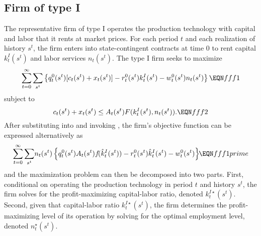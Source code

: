 \subsection{Firm of type I}
The representative firm of type I operates the production technology
with capital and labor that it rents at market prices. For each period
$t$ and each realization of history $s^t$, the firm enters into
state-contingent contracts at time $0$ to rent capital $k^{I}_t(s^t)$
and labor services $n_t(s^t)$. The type I firm
seeks to maximize
$$ \sumst \left\{\qst [\cst +\xst]   -\rst k^I_t(s^t)
   -\wst \nst \right\} \EQN fff1 $$
subject to
$$ \cst +\xst \leq \Ast F(k^I_t(s^t), \nst). \EQN fff2 $$
After substituting  into  and invoking
, the firm's objective function can be
expressed alternatively as
$$ \sumst \nst\left\{\qst \Ast f\!(\hat k^I_t(s^t))
    -\rst \hat k^I_t(s^t)  -\wst \right\} \hskip-.1cm\EQN fff1prime $$
and the maximization problem can then be decomposed into two parts.
First, conditional on operating the production technology
in period $t$ and history $s^t$, the firm solves for the
profit-maximizing capital-labor ratio, denoted $k^{I\star}_t(s^t)$.
Second, given that capital-labor ratio $k^{I\star}_t(s^t)$,
the firm determines the profit-maximizing level of its operation
by solving for the optimal employment level, denoted
$n^\star_t(s^t)$.


